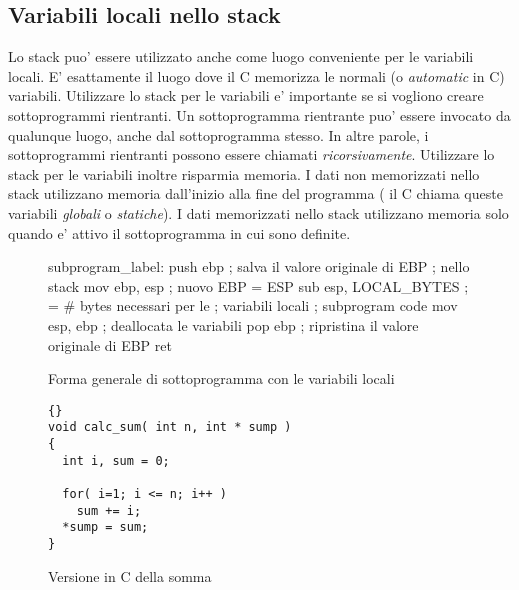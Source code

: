 \subsection{Variabili locali nello stack}

Lo stack puo' essere utilizzato anche come luogo conveniente per le variabili
locali. E' esattamente il luogo dove il C memorizza le normali (o \emph{automatic} 
in C) variabili. Utilizzare lo stack per le variabili e' importante se
si vogliono creare sottoprogrammi rientranti. Un sottoprogramma rientrante
puo' essere invocato da qualunque luogo, anche dal sottoprogramma stesso.
In altre parole, i sottoprogrammi rientranti possono essere chiamati
\emph{ricorsivamente}. Utilizzare lo stack per le variabili inoltre 
risparmia memoria. I dati non memorizzati nello stack utilizzano memoria
dall'inizio alla fine del programma ( il C chiama queste variabili
\emph{globali} o \emph{statiche}). I dati memorizzati nello stack utilizzano
memoria solo quando e' attivo il sottoprogramma in cui sono definite.

\begin{figure}[t]
\begin{AsmCodeListing}[frame=single]
subprogram_label:
      push   ebp            ; salva il valore originale di EBP
        										; nello stack
      mov    ebp, esp       ; nuovo EBP = ESP
      sub    esp, LOCAL_BYTES   ; = # bytes necessari per le 
      												  ; variabili locali
; subprogram code
      mov    esp, ebp       ; deallocata le variabili
      pop    ebp            ; ripristina il valore originale di EBP 
      ret
\end{AsmCodeListing}
\caption{Forma generale di sottoprogramma con le variabili locali\label{fig:subskel2}}
\end{figure}

\begin{figure}[t]
\begin{lstlisting}[frame=tlrb]{}
void calc_sum( int n, int * sump )
{
  int i, sum = 0;

  for( i=1; i <= n; i++ )
    sum += i;
  *sump = sum;
}
\end{lstlisting}
\caption{Versione in C della somma \label{fig:Csum}}
\end{figure}

